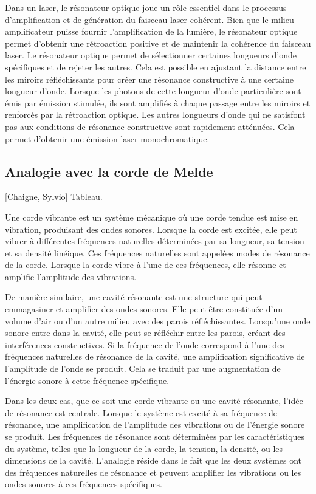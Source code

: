 \documentclass[11pt]{report}
\numberwithin{figure}{section}
\numberwithin{equation}{section}
\numberwithin{table}{section}
\newcommand{\1}{\boldsymbol{1}}
\begin{document}
Dans un laser, le résonateur optique joue un rôle essentiel dans le processus d'amplification et de génération du faisceau laser cohérent. Bien que le milieu amplificateur puisse fournir l'amplification de la lumière, le résonateur optique permet d'obtenir une rétroaction positive et de maintenir la cohérence du faisceau laser. Le résonateur optique permet de sélectionner certaines longueurs d'onde spécifiques et de rejeter les autres. Cela est possible en ajustant la distance entre les miroirs réfléchissants pour créer une résonance constructive à une certaine longueur d'onde. Lorsque les photons de cette longueur d'onde particulière sont émis par émission stimulée, ils sont amplifiés à chaque passage entre les miroirs et renforcés par la rétroaction optique. Les autres longueurs d'onde qui ne satisfont pas aux conditions de résonance constructive sont rapidement atténuées. Cela permet d'obtenir une émission laser monochromatique.

\subsection{Analogie avec la corde de Melde}

[Chaigne, Sylvio] Tableau.

Une corde vibrante est un système mécanique où une corde tendue est mise en vibration, produisant des ondes sonores. Lorsque la corde est excitée, elle peut vibrer à différentes fréquences naturelles déterminées par sa longueur, sa tension et sa densité linéique. Ces fréquences naturelles sont appelées modes de résonance de la corde. Lorsque la corde vibre à l'une de ces fréquences, elle résonne et amplifie l'amplitude des vibrations. 

De manière similaire, une cavité résonante est une structure qui peut emmagasiner et amplifier des ondes sonores. Elle peut être constituée d'un volume d'air ou d'un autre milieu avec des parois réfléchissantes. Lorsqu'une onde sonore entre dans la cavité, elle peut se réfléchir entre les parois, créant des interférences constructives. Si la fréquence de l'onde correspond à l'une des fréquences naturelles de résonance de la cavité, une amplification significative de l'amplitude de l'onde se produit. Cela se traduit par une augmentation de l'énergie sonore à cette fréquence spécifique.

Dans les deux cas, que ce soit une corde vibrante ou une cavité résonante, l'idée de résonance est centrale. Lorsque le système est excité à sa fréquence de résonance, une amplification de l'amplitude des vibrations ou de l'énergie sonore se produit. Les fréquences de résonance sont déterminées par les caractéristiques du système, telles que la longueur de la corde, la tension, la densité, ou les dimensions de la cavité. L'analogie réside dans le fait que les deux systèmes ont des fréquences naturelles de résonance et peuvent amplifier les vibrations ou les ondes sonores à ces fréquences spécifiques.
\end{document}
